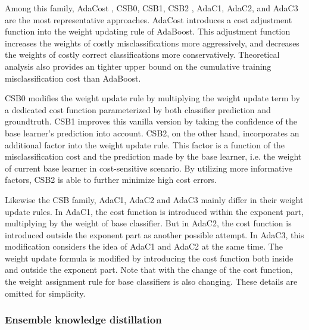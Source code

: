 Among this family, AdaCost \cite{fan1999adacost}, CSB0, CSB1, CSB2 \cite{ting2000comparative}, AdaC1, AdaC2, and AdaC3 \cite{sun2007cost} are the most representative approaches. 
AdaCost introduces a cost adjustment function into the weight updating rule of AdaBoost. This adjustment function increases the weights of costly misclassifications more aggressively, and decreases the weights of costly correct classifications more conservatively. Theoretical analysis also provides an tighter upper bound on the cumulative training misclassification cost than AdaBoost.

CSB0 modifies the weight update rule by multiplying the weight update term by a dedicated cost function parameterized by both classifier prediction and groundtruth. CSB1 improves this vanilla version by taking the confidence of the base learner's prediction into account. 
CSB2, on the other hand, incorporates an additional factor into the weight update rule. This factor is a function of the misclassification cost and the prediction made by the base learner, i.e. the weight of current base learner in cost-sensitive scenario. By utilizing more informative factors, CSB2 is able to further minimize high cost errors.

Likewise the CSB family, AdaC1, AdaC2 and AdaC3 mainly differ in their weight update rules. In AdaC1, the cost function is introduced within the exponent part, multiplying by the weight of base classifier.
But in AdaC2, the cost function is introduced outside the exponent part as another possible attempt. In AdaC3, this modification considers the idea of AdaC1 and AdaC2 at the same time. The weight update formula is modified by introducing the cost function both inside and outside the exponent part. Note that with the change of the cost function, the weight assignment rule for base classifiers is also changing. These details are omitted for simplicity.



\subsubsection{Ensemble knowledge distillation} \
\label{s344}

